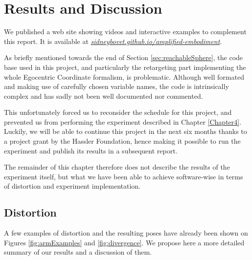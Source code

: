 
\chapter{Results and Discussion}
\label{Chapter5}

We published a web site showing videos and interactive examples to complement this report. It is available at \href{https://sidneybovet.github.io/amplified-embodiment/}{\textit{sidneybovet.github.io/amplified-embodiment}}.

As briefly mentioned towards the end of Section \ref{sec:reachableSphere}, the code base used in this project, and particularly the retargeting part implementing the whole Egocentric Coordinate formalism, is problematic. Although well formated and making use of carefully chosen variable names, the code is intrinsically complex and has sadly not been well documented nor commented.

This unfortunately forced us to reconsider the schedule for this project, and prevented us from performing the experiment described in Chapter \ref{Chapter4}. Luckily, we will be able to continue this project in the next six months thanks to a project grant by the Hassler Foundation, hence making it possible to run the experiment and publish its results in a subsequent report.

The remainder of this chapter therefore does not describe the results of the experiment itself, but what we have been able to achieve software-wise in terms of distortion and experiment implementation.

\section{Distortion}

A few examples of distortion and the resulting poses have already been shown on Figures \ref{fig:armExamples} and \ref{fig:divergence}. We propose here a more detailed summary of our results and a discussion of them.


